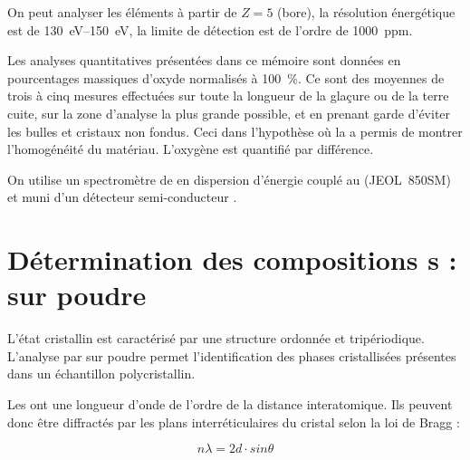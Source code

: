 On peut analyser les éléments à partir de $Z=5$ (bore), 
la résolution énergétique est de 
\SIrange[range-phrase=\ à\ ]{130}{150}{\electronvolt}, la limite de 
détection est de l'ordre de \SI{1000}{ppm}.

Les analyses quantitatives présentées dans ce mémoire sont données 
en pourcentages massiques d'oxyde normalisés à \SI{100}{\percent}. 
Ce sont des moyennes de trois à cinq mesures effectuées sur toute la 
longueur de la glaçure ou de la terre cuite, sur la zone d'analyse 
la plus grande possible, et en prenant garde d'éviter les bulles et 
cristaux non fondus. Ceci dans l'hypothèse où la \CL a permis de 
montrer l'homogénéité du matériau. L'oxygène est quantifié par 
différence.

On utilise un spectromètre de \RX en dispersion d'énergie couplé au 
\MEB (JEOL~850SM) et muni d'un détecteur semi-conducteur .

\section[Diffraction de \RX]{Détermination des compositions \cristallo s : \DX sur poudre}

L'état cristallin est caractérisé par une structure ordonnée et tripériodique. L'analyse par \DX sur poudre permet l'identification des phases cristallisées présentes dans un échantillon polycristallin.

Les \RX ont une longueur d'onde de l'ordre de la distance 
interatomique. Ils peuvent donc être diffractés par les plans 
interréticulaires du cristal selon la loi de Bragg :


\begin{equation*}
  n \lambda = 2 d \cdot sin\theta
\end{equation*}

\bigskip

